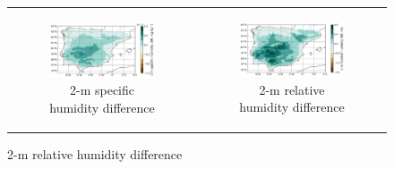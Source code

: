 \begin{figure}[htbp]
\begin{tabular}{cc}
        \begin{subfigure}[b]{0.5\textwidth}
            \caption{2-m specific humidity difference}
            \includegraphics[width=\textwidth]{images/chap4/future/diffmap_q2m_futirr.png}
        \end{subfigure} &
        \begin{subfigure}[b]{0.5\textwidth}
            \caption{2-m relative humidity difference}
            \includegraphics[width=\textwidth]{images/chap4/future/diffmap_rh2m_futirr.png}
        \end{subfigure} \\


\end{tabular}
\end{figure}
